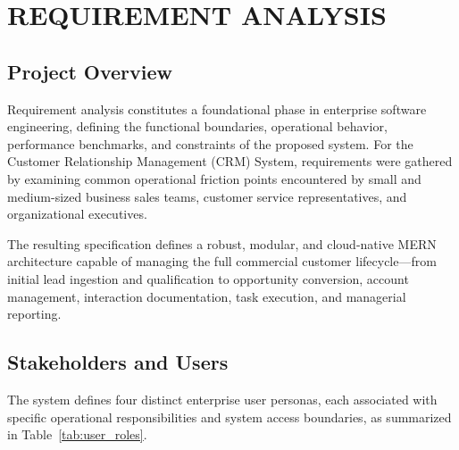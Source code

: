 \chapter{REQUIREMENT ANALYSIS}

\section{Project Overview}
Requirement analysis constitutes a foundational phase in enterprise software engineering, defining the functional boundaries, operational behavior, performance benchmarks, and constraints of the proposed system. For the Customer Relationship Management (CRM) System, requirements were gathered by examining common operational friction points encountered by small and medium-sized business sales teams, customer service representatives, and organizational executives.

The resulting specification defines a robust, modular, and cloud-native MERN architecture capable of managing the full commercial customer lifecycle—from initial lead ingestion and qualification to opportunity conversion, account management, interaction documentation, task execution, and managerial reporting.

\section{Stakeholders and Users}
The system defines four distinct enterprise user personas, each associated with specific operational responsibilities and system access boundaries, as summarized in Table~\ref{tab:user_roles}.


